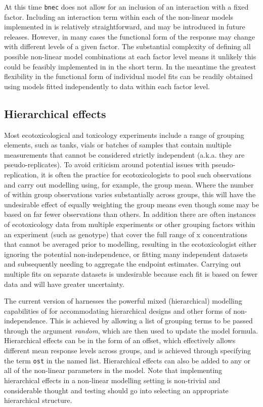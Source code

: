 \documentclass[
]{jss}
\begin{document}
At this time \texttt{bnec} does not allow for an inclusion of an
interaction with a fixed factor. Including an interaction term within
each of the non-linear models implemented in  is
relatively straightforward, and may be introduced in future releases.
However, in many cases the functional form of the response may change
with different levels of a given factor. The substantial complexity of
defining all possible non-linear model combinations at each factor level
means it unlikely this could be feasibly implemented in 
in the short term. In the meantime the greatest flexibility in the
functional form of individual model fits can be readily obtained using
models fitted independently to data within each factor level.

\hypertarget{hierarchical-effects}{%
\subsection{Hierarchical effects}\label{hierarchical-effects}}

Most ecotoxicological and toxicology experiments include a range of
grouping elements, such as tanks, vials or batches of samples that
contain multiple measurements that cannot be considered strictly
independent (a.k.a. they are pseudo-replicates). To avoid criticism
around potential issues with pseudo-replication, it is often the
practice for ecotoxicologists to pool such observations and carry out
modelling using, for example, the group mean. Where the number of within
group observations varies substantially across groups, this will have
the undesirable effect of equally weighting the group means even though
some may be based on far fewer observations than others. In addition
there are often instances of ecotoxicology data from multiple
experiments or other grouping factors within an experiment (such as
genotype) that cover the full range of x concentrations that cannot be
averaged prior to modelling, resulting in the ecotoxicologist either
ignoring the potential non-independence, or fitting many independent
datasets and subsequently needing to aggregate the endpoint estimates.
Carrying out multiple fits on separate datasets is undesirable because
each fit is based on fewer data and will have greater uncertainty.

The current version of  harnesses the powerful mixed
(hierarchical) modelling capabilities of  for accommodating
hierarchical designs and other forms of non-independence. This is
achieved by allowing a list of grouping terms to be passed through the
argument \emph{random}, which are then used to update the 
model formula. Hierarchical effects can be in the form of an offset,
which effectively allows different mean response levels across groups,
and is achieved through specifying the term \texttt{ost} in the named
list. Hierarchical effects can also be added to any or all of the
non-linear parameters in the model. Note that implementing hierarchical
effects in a non-linear modelling setting is non-trivial and
considerable thought and testing should go into selecting an appropriate
hierarchical structure.
\end{document}
